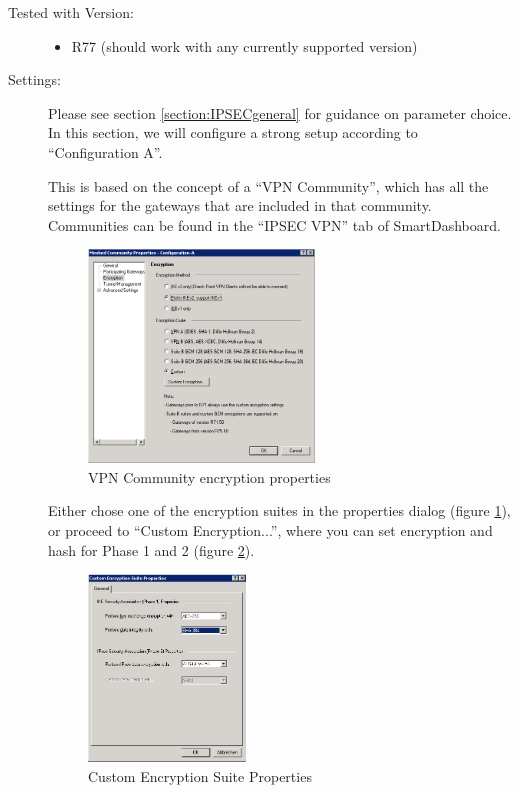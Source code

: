 \begin{description}
\item[Tested with Version:] \mbox{}

\begin{itemize}
\item R77 (should work with any currently supported version)
\end{itemize}

\item[Settings:] \mbox{}

Please see section \ref{section:IPSECgeneral} for guidance on
parameter choice. In this section, we will configure a strong setup
according to ``Configuration A''.

This is based on the concept of a ``VPN Community'', which has all the
settings for the gateways that are included in that community.
Communities can be found in the ``IPSEC VPN'' tab of SmartDashboard.

\begin{figure}[p]
  \centering
  \includegraphics[width=0.592\textwidth]{checkpoint_1.png}
  \caption{VPN Community encryption properties}
  \label{fig:checkpoint_1}
\end{figure}

Either chose one of the encryption suites in the properties dialog
(figure \ref{fig:checkpoint_1}), or proceed to
``Custom Encryption...'', where you can set encryption and hash for
Phase 1 and 2 (figure \ref{fig:checkpoint_2}).

\begin{figure}[p]
  \centering
  \includegraphics[width=0.411\textwidth]{checkpoint_2.png}
  \caption{Custom Encryption Suite Properties}
  \label{fig:checkpoint_2}
\end{figure}


\end{description}
